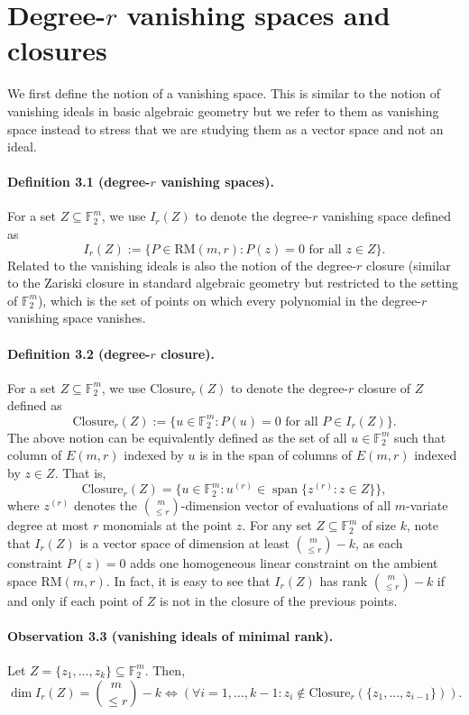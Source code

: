 \documentclass[10pt,a4paper]{article}
\begin{document}
\section*{Degree-$r$ vanishing spaces and closures}
We first define the notion of a vanishing space. This is similar to the notion of vanishing ideals in basic algebraic geometry but we refer to them as vanishing space instead to stress that we are studying them as a vector space and not an ideal.
\paragraph{Definition 3.1 (degree-$r$ vanishing spaces).} For a set $Z\subseteq\mathbb F_2^m$, we use $I_r(Z)$ to denote the degree-$r$ vanishing space defined as
\[I_r(Z):=\{P\in\mathrm{RM}(m,r):P(z)=0\text{ for all }z\in Z\}.\]
Related to the vanishing ideals is also the notion of the degree-$r$ closure (similar to the Zariski closure in standard algebraic geometry but restricted to the setting of $\mathbb F_2^m$), which is the set of points on which every polynomial in the degree-$r$ vanishing space vanishes.
\paragraph{Definition 3.2 (degree-$r$ closure).} For a set $Z\subseteq\mathbb F_2^m$, we use $\mathrm{Closure}_r(Z)$ to denote the degree-$r$ closure of $Z$ defined as
\[\mathrm{Closure}_r(Z):=\{u\in\mathbb F_2^m:P(u)=0\text{ for all }P\in I_r(Z)\}.\]
The above notion can be equivalently defined as the set of all $u\in\mathbb F_2^m$ such that column of $E(m,r)$ indexed by $u$ is in the span of columns of $E(m,r)$ indexed by $z\in Z$. That is,
\[\mathrm{Closure}_r(Z)=\{u\in\mathbb F_2^m:u^{(r)}\in\operatorname{span}\{z^{(r)}:z\in Z\}\},\]
where $z^{(r)}$ denotes the $\binom m{\le r}$-dimension vector of evaluations of all $m$-variate degree at most $r$ monomials at the point $z$. For any set $Z\subseteq\mathbb F_2^m$ of size $k$, note that $I_r(Z)$ is a vector space of dimension at least $\binom m{\le r}-k$, as each constraint $P(z)=0$ adds one homogeneous linear constraint on the ambient space $\mathrm{RM}(m,r)$. In fact, it is easy to see that $I_r(Z)$ has rank $\binom m{\le r}-k$ if and only if each point of $Z$ is not in the closure of the previous points.
\paragraph{Observation 3.3 (vanishing ideals of minimal rank).} Let $Z=\{z_1,\ldots,z_k\}\subseteq\mathbb F_2^m$. Then,
\[\dim I_r(Z)=\binom m{\le r}-k\iff(\forall i=1,\ldots,k-1:z_i\notin\mathrm{Closure}_r(\{z_1,\ldots,z_{i-1}\})).\]
\end{document}
